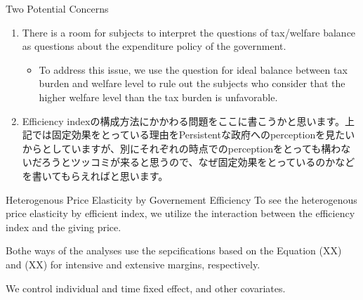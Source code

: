 \documentclass[
  ignorenonframetext,
]{beamer}
\providecommand{\tightlist}{%
  \setlength{\itemsep}{0pt}\setlength{\parskip}{0pt}}
\begin{document}
\begin{frame}{Two Potential Concerns}
\protect\hypertarget{two-potential-concerns}{}
\begin{enumerate}
\tightlist
\item
  There is a room for subjects to interpret the questions of tax/welfare balance as questions about the expenditure policy of the government.

  \begin{itemize}
  \tightlist
  \item
    To address this issue, we use the question for ideal balance between tax burden and welfare level to rule out the subjects who consider that the higher welfare level than the tax burden is unfavorable.
  \end{itemize}
\item
  Efficiency indexの構成方法にかかわる問題をここに書こうかと思います。上記では固定効果をとっている理由をPersistentな政府へのperceptionを見たいからとしていますが、別にそれぞれの時点でのperceptionをとっても構わないだろうとツッコミが来ると思うので、なぜ固定効果をとっているのかなどを書いてもらえればと思います。
\end{enumerate}
\end{frame}

\begin{frame}{Heterogenous Price Elasticity by Governement Efficiency}
\protect\hypertarget{heterogenous-price-elasticity-by-governement-efficiency}{}
To see the heterogenous price elasticity by efficient index,
we utilize the interaction between the efficiency index and the giving price.

Bothe ways of the analyses use the sepcifications based on the Equation (XX) and (XX) for intensive and extensive margins,
respectively.

We control individual and time fixed effect,
and other covariates.
\end{frame}
\end{document}
